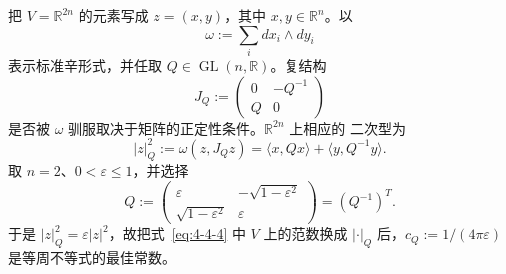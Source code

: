 \begin{example}\label{ex:4-4-5}
把 $V=\mathbb R^{2n}$ 的元素写成 $z=(x,y)$，其中 $x,y\in\mathbb R^n$。以
\[
  \omega:=\sum_i dx_i\wedge dy_i
\]
表示标准辛形式，并任取 $Q\in\operatorname{GL}(n,\mathbb R)$。复结构
\[
  J_Q:=
  \begin{pmatrix}
    0&-Q^{-1}\\
    Q&0
  \end{pmatrix}
\]
是否被 $\omega$ 驯服取决于矩阵的正定性条件。$\mathbb R^{2n}$ 上相应的
二次型为
\[
  |z|_Q^2:=\omega(z,J_Qz)
  =\langle x,Qx\rangle+\langle y,Q^{-1}y\rangle.
\]
取 $n=2$、$0<\varepsilon\le1$，并选择
\[
  Q:=
  \begin{pmatrix}
    \varepsilon&-\sqrt{1-\varepsilon^2}\\
    \sqrt{1-\varepsilon^2}&\varepsilon
  \end{pmatrix}
  =(Q^{-1})^T.
\]
于是 $|z|_Q^2=\varepsilon|z|^2$，故把式~\eqref{eq:4-4-4} 中 $V$ 上的范数换成
$|\cdot|_Q$ 后，$c_Q:=1/(4\pi\varepsilon)$ 是等周不等式的最佳常数。
\end{example}

